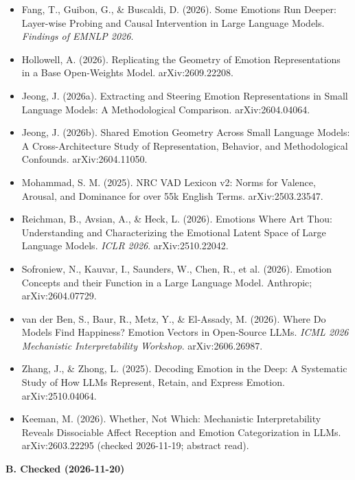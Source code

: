 \documentclass[
  10pt,
]{article}
\providecommand{\tightlist}{%
  \setlength{\itemsep}{0pt}\setlength{\parskip}{0pt}}
\begin{document}
\begin{itemize}
\tightlist
\item
  Fang, T., Guibon, G., \& Buscaldi, D. (2026). Some Emotions Run
  Deeper: Layer-wise Probing and Causal Intervention in Large Language
  Models. \emph{Findings of EMNLP 2026}.
\item
  Hollowell, A. (2026). Replicating the Geometry of Emotion
  Representations in a Base Open-Weights Model. arXiv:2609.22208.
\item
  Jeong, J. (2026a). Extracting and Steering Emotion Representations in
  Small Language Models: A Methodological Comparison. arXiv:2604.04064.
\item
  Jeong, J. (2026b). Shared Emotion Geometry Across Small Language
  Models: A Cross-Architecture Study of Representation, Behavior, and
  Methodological Confounds. arXiv:2604.11050.
\item
  Mohammad, S. M. (2025). NRC VAD Lexicon v2: Norms for Valence,
  Arousal, and Dominance for over 55k English Terms. arXiv:2503.23547.
\item
  Reichman, B., Avsian, A., \& Heck, L. (2026). Emotions Where Art Thou:
  Understanding and Characterizing the Emotional Latent Space of Large
  Language Models. \emph{ICLR 2026}. arXiv:2510.22042.
\item
  Sofroniew, N., Kauvar, I., Saunders, W., Chen, R., et al. (2026).
  Emotion Concepts and their Function in a Large Language Model.
  Anthropic; arXiv:2604.07729.
\item
  van der Ben, S., Baur, R., Metz, Y., \& El-Assady, M. (2026). Where Do
  Models Find Happiness? Emotion Vectors in Open-Source LLMs. \emph{ICML
  2026 Mechanistic Interpretability Workshop}. arXiv:2606.26987.
\item
  Zhang, J., \& Zhong, L. (2025). Decoding Emotion in the Deep: A
  Systematic Study of How LLMs Represent, Retain, and Express Emotion.
  arXiv:2510.04064.
\item
  Keeman, M. (2026). Whether, Not Which: Mechanistic Interpretability
  Reveals Dissociable Affect Reception and Emotion Categorization in
  LLMs. arXiv:2603.22295 (checked 2026-11-19; abstract read).
\end{itemize}

\textbf{B. Checked (2026-11-20)}
\end{document}
